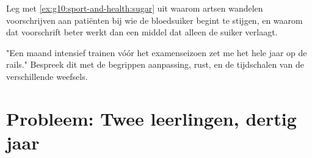 \begin{exercise}[$\star\star\star$]\label{exo:g10:sport-and-health:14}
Leg met \cref{ex:g10:sport-and-health:sugar} uit waarom artsen wandelen
voorschrijven aan patiënten bij wie de bloedsuiker begint te stijgen, en
waarom dat voorschrift beter werkt dan een middel dat alleen de suiker
verlaagt.
\end{exercise}

\begin{exercise}[$\star\star\star$]\label{exo:g10:sport-and-health:15}
"Een maand intensief trainen vóór het examenseizoen zet me het hele jaar
op de rails." Bespreek dit met de begrippen aanpassing, rust, en de
tijdschalen van de verschillende weefsels.
\end{exercise}

\section{Probleem: Twee leerlingen, dertig jaar}

